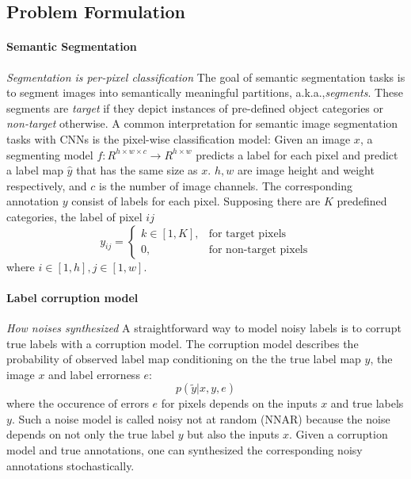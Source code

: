\subsection{Problem Formulation}
\label{subsec:formulation}

\paragraph{Semantic Segmentation}
\noindent \textit{Segmentation is per-pixel classification}
\noindent
The goal of semantic segmentation tasks is to segment images into semantically meaningful partitions, a.k.a.,\textit{segments}.
These segments are \textit{target} if they depict instances of pre-defined object categories or \textit{non-target} otherwise.
A common interpretation for semantic image segmentation tasks with CNNs is the pixel-wise classification model:
Given an image $x$, a segmenting model $f: R^{h \times w \times c} \rightarrow R^{h \times w}$ predicts a label for each pixel and predict a label map $\hat{y}$ that has the same size as $x$.
$h, w$ are image height and weight respectively, and $c$ is the number of image channels.
The corresponding annotation $y$ consist of labels for each pixel.
Supposing there are $K$ predefined categories, the label of pixel ${ij}$
\[
  y_{ij} =
    \begin{cases}
      k \in [1,K], & \text{for target pixels} \\
      0, & \text{for non-target pixels}
    \end{cases}
\]
where $i \in [1,h], j \in [1,w]$.

\paragraph{Label corruption model}
\noindent \textit{How noises synthesized}
\noindent
A straightforward way to model noisy labels is to corrupt true labels with a corruption model.
The corruption model describes the probability of observed label map conditioning on the the true label map $y$, the image $x$ and label errorness $e$:
$$p(\tilde{y} \vert x, y, e)$$
where the occurence of errors $e$ for pixels depends on the inputs $x$ and true labels $y$.
Such a noise model is called noisy not at random (NNAR) \cite{frenay2014classification} because the noise depends on not only the true label $y$ but also the inputs $x$.
Given a corruption model and true annotations, one can synthesized the corresponding noisy annotations stochastically.

